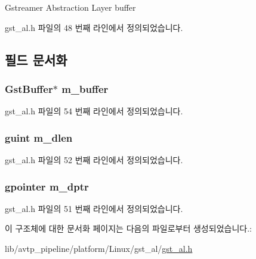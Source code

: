 \begin{DoxyItemize}
\item Gstreamer Abstraction Layer buffer 
\end{DoxyItemize}

gst\+\_\+al.\+h 파일의 48 번째 라인에서 정의되었습니다.



\subsection{필드 문서화}
\subsubsection[{\texorpdfstring{m\+\_\+buffer}{m_buffer}}]{\setlength{\rightskip}{0pt plus 5cm}Gst\+Buffer$\ast$ m\+\_\+buffer}\hypertarget{struct___gst_al_buf_aae73c5ec81b259f66d177d20c4f7c800}{}\label{struct___gst_al_buf_aae73c5ec81b259f66d177d20c4f7c800}


gst\+\_\+al.\+h 파일의 54 번째 라인에서 정의되었습니다.

\subsubsection[{\texorpdfstring{m\+\_\+dlen}{m_dlen}}]{\setlength{\rightskip}{0pt plus 5cm}guint m\+\_\+dlen}\hypertarget{struct___gst_al_buf_a65fa93d8c9a5923310d1350432b670de}{}\label{struct___gst_al_buf_a65fa93d8c9a5923310d1350432b670de}


gst\+\_\+al.\+h 파일의 52 번째 라인에서 정의되었습니다.

\subsubsection[{\texorpdfstring{m\+\_\+dptr}{m_dptr}}]{\setlength{\rightskip}{0pt plus 5cm}gpointer m\+\_\+dptr}\hypertarget{struct___gst_al_buf_af816e6d2aeca9ce8a164007a969c02bd}{}\label{struct___gst_al_buf_af816e6d2aeca9ce8a164007a969c02bd}


gst\+\_\+al.\+h 파일의 51 번째 라인에서 정의되었습니다.



이 구조체에 대한 문서화 페이지는 다음의 파일로부터 생성되었습니다.\+:\begin{DoxyCompactItemize}
\item 
lib/avtp\+\_\+pipeline/platform/\+Linux/gst\+\_\+al/\hyperlink{gst__al_8h}{gst\+\_\+al.\+h}\end{DoxyCompactItemize}
